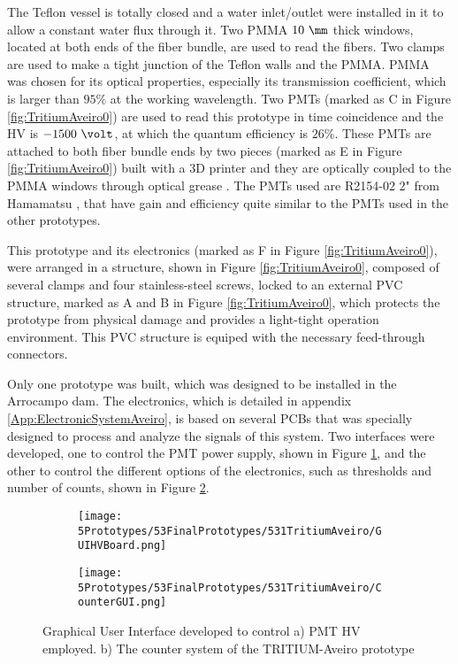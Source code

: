 The Teflon vessel is totally closed and  a water inlet/outlet were installed in it to allow a constant water flux through it. Two PMMA $10~\mm$ thick windows, located at both ends of the fiber bundle, are used to read the fibers. Two clamps are used to make a tight junction of the Teflon walls and the PMMA. PMMA was chosen for its optical properties, especially its transmission coefficient, which is larger than $95\%$ at the working wavelength. Two PMTs (marked as C in Figure \ref{fig:TritiumAveiro0}) are used to read this prototype in time coincidence and the HV is $-1500~\volt$, at which the quantum efficiency is $26\%$. These PMTs are attached to both fiber bundle ends by two pieces (marked as E in Figure \ref{fig:TritiumAveiro0}) built with a 3D printer and they are optically coupled to the PMMA windows through optical grease \cite{OpticalGrease}. The PMTs used are R2154-02 2" from Hamamatsu \cite{DataSheetPMTsAveiro}, that have gain and efficiency quite similar to the PMTs used in the other prototypes.

This prototype and its electronics (marked as F in Figure \ref{fig:TritiumAveiro0}), were arranged in a structure, shown in Figure \ref{fig:TritiumAveiro0}, composed of several clamps and four stainless-steel screws, locked to an external PVC structure, marked as A and B in Figure \ref{fig:TritiumAveiro0}, which protects the prototype from physical damage and provides a light-tight operation environment. This PVC structure is equiped with the necessary feed-through connectors.

Only one prototype was built, which was designed to be installed in the Arrocampo dam. The electronics, which is detailed in appendix \ref{App:ElectronicSystemAveiro}, is based on several PCBs that was specially designed to process and analyze the signals of this system. Two interfaces were developed, one to control the PMT power supply, shown in Figure \ref{subfig:GUIHV}, and the other to control the different options of the electronics, such as thresholds and number of counts, shown in Figure \ref{subfig:GUIcounts}.

\begin{figure}
\centering
    \begin{subfigure}[b]{0.65\textwidth}
    \centering
    \texttt{[image: 5Prototypes/53FinalPrototypes/531TritiumAveiro/GUIHVBoard.png]}  
    \caption{\label{subfig:GUIHV}}
    \end{subfigure}
    \hfill
    \begin{subfigure}[b]{0.8\textwidth}
    \centering
    \texttt{[image: 5Prototypes/53FinalPrototypes/531TritiumAveiro/CounterGUI.png]}  
    \caption{\label{subfig:GUIcounts}}
    \end{subfigure}
 \caption{Graphical User Interface developed to control a) PMT HV employed. b) The counter system of the TRITIUM-Aveiro prototype}
 \label{fig:GUITRITIUMAveiro}
\end{figure}

